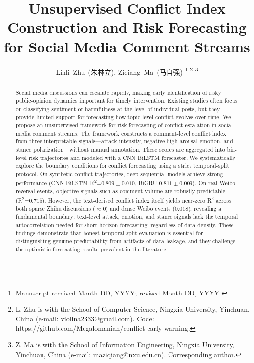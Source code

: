 \documentclass[journal]{IEEEtran}
\begin{document}
\title{Unsupervised Conflict Index Construction and Risk Forecasting for Social Media Comment Streams}

\author{Linli~Zhu\ (朱林立), Ziqiang~Ma\ (马自强)%
\thanks{Manuscript received Month DD, YYYY; revised Month DD, YYYY.}%
\thanks{L. Zhu is with the School of Computer Science, Ningxia University, Yinchuan, China (e-mail: violina2333@gmail.com). Code: https://github.com/Megalomanian/conflict-early-warning.}%
\thanks{Z. Ma is with the School of Information Engineering, Ningxia University, Yinchuan, China (e-mail: maziqiang@nxu.edu.cn). Corresponding author.}}

\maketitle

\begin{abstract}
Social media discussions can escalate rapidly, making early identification of risky public-opinion dynamics important for timely intervention. Existing studies often focus on classifying sentiment or harmfulness at the level of individual posts, but they provide limited support for forecasting how topic-level conflict evolves over time. We propose an unsupervised framework for risk forecasting of conflict escalation in social-media comment streams. The framework constructs a comment-level conflict index from three interpretable signals---attack intensity, negative high-arousal emotion, and stance polarization---without manual annotation. These scores are aggregated into bin-level risk trajectories and modeled with a CNN-BiLSTM forecaster. We systematically explore the boundary conditions for conflict forecasting using a strict temporal-split protocol. On synthetic conflict trajectories, deep sequential models achieve strong performance (CNN-BiLSTM R\textsuperscript{2}=$0.809\pm0.010$, BiGRU $0.811\pm0.009$). On real Weibo reversal events, objective signals such as comment volume are robustly predictable (R\textsuperscript{2}=$0.715$). However, the text-derived conflict index itself yields near-zero R\textsuperscript{2} across both sparse Zhihu discussions ($\approx 0$) and dense Weibo events ($0.018$), revealing a fundamental boundary: text-level attack, emotion, and stance signals lack the temporal autocorrelation needed for short-horizon forecasting, regardless of data density. These findings demonstrate that honest temporal-split evaluation is essential for distinguishing genuine predictability from artifacts of data leakage, and they challenge the optimistic forecasting results prevalent in the literature.
\end{abstract}
\end{document}
